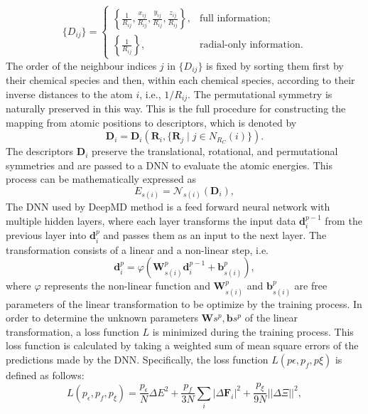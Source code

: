 \begin{equation}
  \{D_{ij}\} = \begin{cases}
    \left\{
      \frac{1}{R_{ij}},
      \frac{x_{ij}}{R_{ij}},
      \frac{y_{ij}}{R_{ij}},
      \frac{z_{ij}}{R_{ij}}
    \right\}, & \text{full information;} \\
    \left\{\frac{1}{R_{ij}}\right\}, & \text{radial-only information.}
  \end{cases}
\end{equation}
The order of the neighbour indices $j$ in $\{D_{ij}\}$ is fixed by sorting
them first by their chemical species and then, within each chemical species,
according to their inverse distances to the atom $i$, i.e., $1/R_{ij}$. The
permutational symmetry is naturally preserved in this way. This is the full
procedure for constructing the mapping from atomic positions to descriptors,
which is denoted by
\begin{equation}
  \mathbf{D}_i = \mathbf{D}_i(
    \mathbf{R}_i, \{\mathbf{R}_j \mid j \in  N_{R_C}(i)\}
  ).
\end{equation}
The descriptors $\mathbf{D}_i$ preserve the translational, rotational, and
permutational symmetries and are passed to a DNN to evaluate the atomic
energies. This process can be mathematically expressed as
\begin{equation}
  E_{s(i)} = \mathcal{N}_{s(i)}(\mathbf{D}_{i}),
\end{equation}
The DNN used by DeepMD method is a feed forward neural network with multiple
hidden layers, where each layer transforms the input data $\mathbf{d}_i^{p-1}$
from the previous layer into $\mathbf{d}_i^{p}$ and passes them as an input
to the next layer. The transformation consists of a linear and a non-linear
step, i.e.
\begin{equation}
  \mathbf{d}_{i}^{p} = \varphi \left(
    \mathbf{W}_{s(i)}^p \mathbf{d}_i^{p-1} + \mathbf{b}^p_{s(i)}
  \right),
\end{equation}
where $\varphi$ represents the non-linear function and $\mathbf{W}_{s(i)}^p$
and $\mathbf{b}^p_{s(i)}$ are free parameters of the linear transformation to
be optimize by the training process. In order to determine the unknown
parameters ${\mathbf{W}{s}^p, \mathbf{b}s^p}$ of the linear transformation, a
loss function $L$ is minimized during the training process. This loss
function is calculated by taking a weighted sum of mean square errors of the
predictions made by the DNN. Specifically, the loss function
$L(p\epsilon, p_f, p\xi)$ is defined as follows:
\begin{equation}
  L(p_\epsilon, p_f, p_\xi) = \frac{p_\epsilon}{N} \Delta E^2 +
  \frac{p_f}{3N} \sum_i |\Delta \mathbf{F}_i|^2
  + \frac{p_\xi}{9N} ||\Delta \Xi||^2,
\end{equation}

